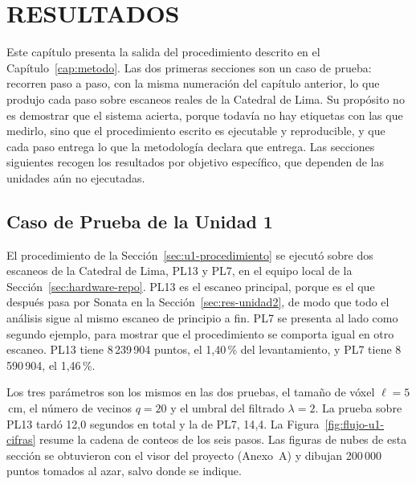\chapter{RESULTADOS}
\label{cap:resultados}

Este capítulo presenta la salida del procedimiento descrito en el
Capítulo~\ref{cap:metodo}. Las dos primeras secciones son un caso de prueba:
recorren paso a paso, con la misma numeración del capítulo anterior, lo que
produjo cada paso sobre escaneos reales de la Catedral de Lima. Su propósito no
es demostrar que el sistema acierta, porque todavía no hay etiquetas con las que
medirlo, sino que el procedimiento escrito es ejecutable y reproducible, y que
cada paso entrega lo que la metodología declara que entrega. Las secciones
siguientes recogen los resultados por objetivo específico, que dependen de las
unidades aún no ejecutadas.

\FloatBarrier
\section{Caso de Prueba de la Unidad 1}
\label{sec:res-unidad1}

El procedimiento de la Sección~\ref{sec:u1-procedimiento} se ejecutó sobre dos
escaneos de la Catedral de Lima, PL13 y PL7, en el equipo local de la
Sección~\ref{sec:hardware-repo}. PL13 es el escaneo principal, porque es el que
después pasa por Sonata en la Sección~\ref{sec:res-unidad2}, de modo que todo el
análisis sigue al mismo escaneo de principio a fin. PL7 se presenta al lado como
segundo ejemplo, para mostrar que el procedimiento se comporta igual en otro
escaneo. PL13 tiene 8\,239\,904 puntos, el 1{,}40\,\% del levantamiento, y PL7
tiene 8\,590\,904, el 1{,}46\,\%.

Los tres parámetros son los mismos en las dos pruebas, el tamaño de vóxel
$\ell=5$\,cm, el número de vecinos $q=20$ y el umbral del filtrado $\lambda=2$.
La prueba sobre PL13 tardó 12{,}0 segundos en total y la de PL7, 14{,}4. La
Figura~\ref{fig:flujo-u1-cifras} resume la cadena de conteos de los seis pasos.
Las figuras de nubes de esta sección se obtuvieron con el visor del proyecto
(Anexo~A) y dibujan 200\,000 puntos tomados al azar, salvo donde se indique.

